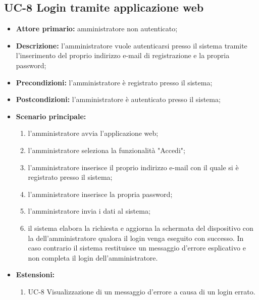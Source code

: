 \subsection{UC-8 Login tramite applicazione web}
\begin{itemize}
	\item \textbf{Attore primario:} amministratore non autenticato;

	\item \textbf{Descrizione:} l'amministratore vuole autenticarsi presso il sistema tramite l'inserimento del proprio indirizzo e-mail di registrazione e la propria password;

	\item \textbf{Precondizioni:} l'amministratore è registrato presso il sistema;

	\item \textbf{Postcondizioni:} l'amministratore è autenticato presso il sistema;

	\item \textbf{Scenario principale:}

	      \begin{enumerate}
		      \item l'amministratore avvia l'applicazione web;
		      \item l'amministratore seleziona la funzionalità "Accedi";
		      \item l'amministratore inserisce il proprio indirizzo e-mail con il quale si è registrato presso il sistema;
		      \item l'amministratore inserisce la propria password;
		      \item l'amministratore invia i dati al sistema;
		      \item il sistema elabora la richiesta e aggiorna la schermata del dispositivo con la  dell'amministratore qualora il login venga eseguito con successo. In caso contrario il sistema restituisce un messaggio d'errore esplicativo e non completa il login dell'amministratore.
	      \end{enumerate}
	\item \textbf{Estensioni:}
	      \begin{enumerate}
		      \item UC-8 Visualizzazione di un messaggio d'errore a causa di un login errato.
	      \end{enumerate}
\end{itemize}
